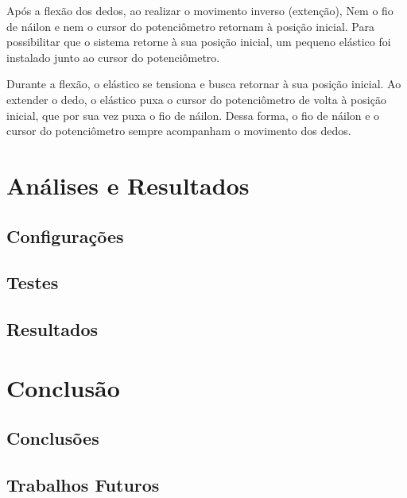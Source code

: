 \documentclass[
	12pt,				%
	openright,			%
	oneside,			%
	a4paper,			%
	english,			%
	brazil				%
	]{abntex2}
\begin{document}
		Após a flexão dos dedos, ao realizar o movimento inverso (extenção), Nem o fio de náilon e nem o cursor do potenciômetro retornam à posição inicial. Para possibilitar que o sistema retorne à sua posição inicial, um pequeno elástico foi instalado junto ao cursor do potenciômetro. 

		Durante a flexão, o elástico se tensiona e busca retornar à sua posição inicial. Ao extender o dedo, o elástico puxa o cursor do potenciômetro de volta à posição inicial, que por sua vez puxa o fio de náilon. Dessa forma, o fio de náilon e o cursor do potenciômetro sempre acompanham o movimento dos dedos.


	
	\chapter{Análises e Resultados}

		\section{Configurações}

		\section{Testes}

		\section{Resultados}
		

  \chapter{Conclusão}

		\section{Conclusões}

		\section{Trabalhos Futuros}


\postextual



\printindex
\end{document}
